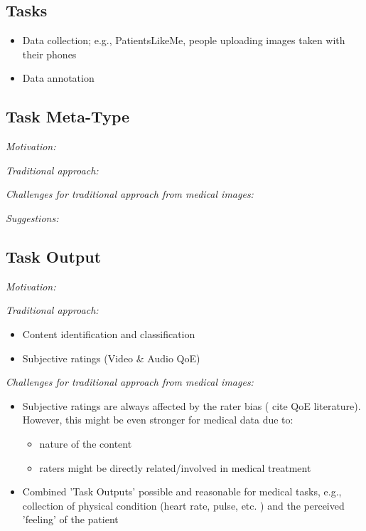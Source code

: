 \documentclass[10pt,twocolumn,letterpaper]{article}
\begin{document}
\subsection{Tasks}
\begin{itemize}
    \item Data collection; e.g., PatientsLikeMe, people uploading images taken with their phones
    \item Data annotation
\end{itemize}

\subsection{Task Meta-Type}
\emph{Motivation:} 

\emph{Traditional approach:}

\emph{Challenges for traditional approach from medical images:}

\emph{Suggestions:}

\subsection{Task Output}
\emph{Motivation:} 

\emph{Traditional approach:}
\begin{itemize}
    \item Content identification and classification
    \item Subjective ratings (Video \& Audio QoE)
\end{itemize}

\emph{Challenges for traditional approach from medical images:}
\begin{itemize}
    \item Subjective ratings are always affected by the rater bias ( cite QoE literature). However, this might be even stronger for medical data due to: 
        \begin{itemize}
            \item nature of the content
            \item raters might be directly related/involved in medical treatment
        \end{itemize}
    \item Combined 'Task Outputs' possible and reasonable for medical tasks, e.g., collection of physical condition (heart rate, pulse, etc. ) and the perceived 'feeling' of the patient
\end{itemize}
\end{document}
